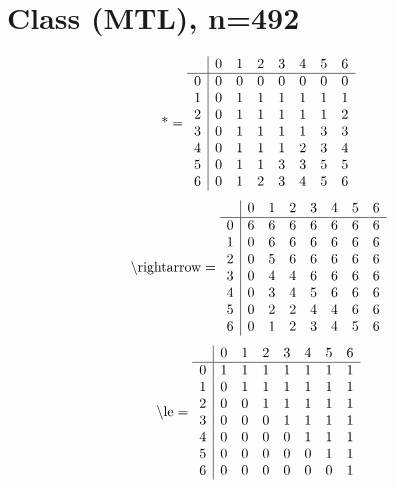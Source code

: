 \documentclass[11pt]{article}
\begin{document}
\section{Class (MTL), n=492}
\[\text{*} = 
\begin{array}{r | r r r r r r r}
 & 0 & 1 & 2 & 3 & 4 & 5 & 6 \\ \hline
0 & 0 & 0 & 0 & 0 & 0 & 0 & 0 \\
1 & 0 & 1 & 1 & 1 & 1 & 1 & 1 \\
2 & 0 & 1 & 1 & 1 & 1 & 1 & 2 \\
3 & 0 & 1 & 1 & 1 & 1 & 3 & 3 \\
4 & 0 & 1 & 1 & 1 & 2 & 3 & 4 \\
5 & 0 & 1 & 1 & 3 & 3 & 5 & 5 \\
6 & 0 & 1 & 2 & 3 & 4 & 5 & 6 \\
\end{array}
\]
\[\text{\textbackslash rightarrow} = 
\begin{array}{r | r r r r r r r}
 & 0 & 1 & 2 & 3 & 4 & 5 & 6 \\ \hline
0 & 6 & 6 & 6 & 6 & 6 & 6 & 6 \\
1 & 0 & 6 & 6 & 6 & 6 & 6 & 6 \\
2 & 0 & 5 & 6 & 6 & 6 & 6 & 6 \\
3 & 0 & 4 & 4 & 6 & 6 & 6 & 6 \\
4 & 0 & 3 & 4 & 5 & 6 & 6 & 6 \\
5 & 0 & 2 & 2 & 4 & 4 & 6 & 6 \\
6 & 0 & 1 & 2 & 3 & 4 & 5 & 6 \\
\end{array}
\]
\[\text{\textbackslash le} = 
\begin{array}{r | r r r r r r r}
 & 0 & 1 & 2 & 3 & 4 & 5 & 6 \\ \hline
0 & 1 & 1 & 1 & 1 & 1 & 1 & 1 \\
1 & 0 & 1 & 1 & 1 & 1 & 1 & 1 \\
2 & 0 & 0 & 1 & 1 & 1 & 1 & 1 \\
3 & 0 & 0 & 0 & 1 & 1 & 1 & 1 \\
4 & 0 & 0 & 0 & 0 & 1 & 1 & 1 \\
5 & 0 & 0 & 0 & 0 & 0 & 1 & 1 \\
6 & 0 & 0 & 0 & 0 & 0 & 0 & 1 \\
\end{array}
\]
\end{document}
